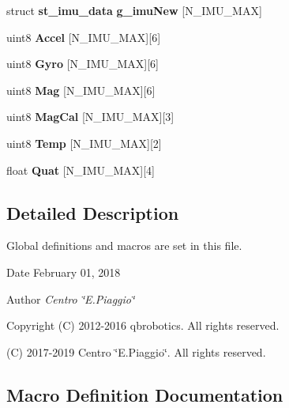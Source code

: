 \begin{DoxyCompactItemize}
\mbox{\label{globals_8h_abb00fd907d732c0691940f718e231178}} 
struct \textbf{ st\+\_\+imu\+\_\+data} {\bfseries g\+\_\+imu\+New} [N\+\_\+\+I\+M\+U\+\_\+\+M\+AX]
\item 
\mbox{\label{globals_8h_a187c605f3898cf11e09f6f469c265920}} 
uint8 {\bfseries Accel} [N\+\_\+\+I\+M\+U\+\_\+\+M\+AX][6]
\item 
\mbox{\label{globals_8h_a49dba88a31d1b3b4190065b9ef1649fe}} 
uint8 {\bfseries Gyro} [N\+\_\+\+I\+M\+U\+\_\+\+M\+AX][6]
\item 
\mbox{\label{globals_8h_a5d88408ccb73729f049a52b4d1daaadf}} 
uint8 {\bfseries Mag} [N\+\_\+\+I\+M\+U\+\_\+\+M\+AX][6]
\item 
\mbox{\label{globals_8h_a1e598e1bdae5fe927fbd1f396161f3a6}} 
uint8 {\bfseries Mag\+Cal} [N\+\_\+\+I\+M\+U\+\_\+\+M\+AX][3]
\item 
\mbox{\label{globals_8h_af5f2d49e123a057d358297a34194ebdc}} 
uint8 {\bfseries Temp} [N\+\_\+\+I\+M\+U\+\_\+\+M\+AX][2]
\item 
\mbox{\label{globals_8h_a79179edea7394e7176f8768b1b0f6f92}} 
float {\bfseries Quat} [N\+\_\+\+I\+M\+U\+\_\+\+M\+AX][4]
\end{DoxyCompactItemize}


\subsection{Detailed Description}
Global definitions and macros are set in this file. 

\begin{DoxyDate}{Date}
February 01, 2018 
\end{DoxyDate}
\begin{DoxyAuthor}{Author}
{\itshape Centro \char`\"{}\+E.\+Piaggio\char`\"{}} 
\end{DoxyAuthor}
\begin{DoxyCopyright}{Copyright}
(C) 2012-\/2016 qbrobotics. All rights reserved. 

(C) 2017-\/2019 Centro \char`\"{}\+E.\+Piaggio\char`\"{}. All rights reserved. 
\end{DoxyCopyright}


\subsection{Macro Definition Documentation}
\mbox{\label{globals_8h_a66edaed675ab232f06a4e5b3c30d101a}} 
